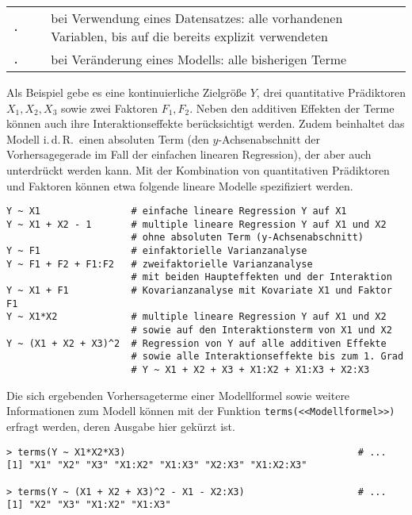 \begin{longtable}{p{1.5cm}p{3cm}p{8cm}}
\lstinline!.!\index[func]{.@\lstinline{.}} & ~ & bei Verwendung eines Datensatzes: alle vorhandenen Variablen, bis auf die bereits explizit verwendeten\\
\lstinline!.! & ~ & bei Veränderung eines Modells: alle bisherigen Terme\\\hline
\end{longtable}

Als Beispiel gebe es eine kontinuierliche Zielgröße $Y$, drei quantitative Prädiktoren $X_{1}, X_{2}, X_{3}$ sowie zwei Faktoren $F_{1}, F_{2}$. Neben den additiven Effekten der Terme können auch ihre Interaktionseffekte berücksichtigt werden. Zudem beinhaltet das Modell i.\,d.\,R.\ einen absoluten Term (den $y$-Achsenabschnitt der Vorhersagegerade im Fall der einfachen linearen Regression), der aber auch unterdrückt werden kann. Mit der Kombination von quantitativen Prädiktoren und Faktoren können etwa folgende lineare Modelle spezifiziert werden.
\begin{lstlisting}
Y ~ X1                # einfache lineare Regression Y auf X1
Y ~ X1 + X2 - 1       # multiple lineare Regression Y auf X1 und X2
                      # ohne absoluten Term (y-Achsenabschnitt)
Y ~ F1                # einfaktorielle Varianzanalyse
Y ~ F1 + F2 + F1:F2   # zweifaktorielle Varianzanalyse
                      # mit beiden Haupteffekten und der Interaktion
Y ~ X1 + F1           # Kovarianzanalyse mit Kovariate X1 und Faktor F1
Y ~ X1*X2             # multiple lineare Regression Y auf X1 und X2
                      # sowie auf den Interaktionsterm von X1 und X2
Y ~ (X1 + X2 + X3)^2  # Regression von Y auf alle additiven Effekte
                      # sowie alle Interaktionseffekte bis zum 1. Grad
                      # Y ~ X1 + X2 + X3 + X1:X2 + X1:X3 + X2:X3
\end{lstlisting}

Die sich ergebenden Vorhersageterme einer Modellformel sowie weitere Informationen zum Modell können mit der Funktion \lstinline!terms(<<Modellformel>>)! erfragt werden, deren Ausgabe hier gekürzt ist.
\begin{lstlisting}
> terms(Y ~ X1*X2*X3)                                         # ...
[1] "X1" "X2" "X3" "X1:X2" "X1:X3" "X2:X3" "X1:X2:X3"

> terms(Y ~ (X1 + X2 + X3)^2 - X1 - X2:X3)                    # ...
[1] "X2" "X3" "X1:X2" "X1:X3"
\end{lstlisting}

